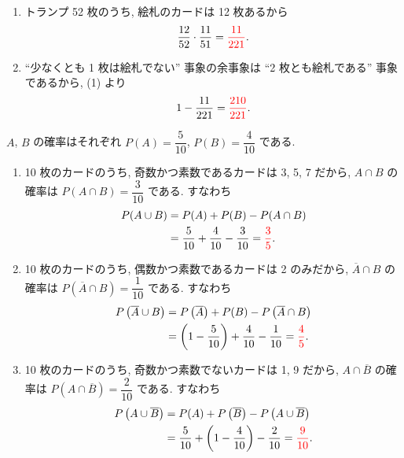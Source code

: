 \begin{enumerate}
	\item{
		トランプ 52 枚のうち, 絵札のカードは 12 枚あるから
		\begin{align}
			\frac{12}{52}\cdot\frac{11}{51} = \textcolor{red}{\frac{11}{221}}.
		\end{align}
	}
	\item{
		``少なくとも 1 枚は絵札でない'' 事象の余事象は ``2 枚とも絵札である'' 事象であるから, (1) より
		\begin{align}
			1 - \frac{11}{221} = \textcolor{red}{\frac{210}{221}}.
		\end{align}
	}
\end{enumerate}

$A$, $B$ の確率はそれぞれ $P(A) = \dfrac{5}{10}$, $P(B) = \dfrac{4}{10}$ である.
\begin{enumerate}
	\item{
		10 枚のカードのうち, 奇数かつ素数であるカードは 3, 5, 7 だから, $A\cap B$ の確率は $P(A\cap B) = \dfrac{3}{10}$ である.
		すなわち
		\begin{align}
			P(A\cup B) &= P(A) + P(B) - P(A\cap B) \\
				&= \frac{5}{10} + \frac{4}{10} - \frac{3}{10} = \textcolor{red}{\frac{3}{5}}.
		\end{align}
	}
	\item{
		10 枚のカードのうち, 偶数かつ素数であるカードは 2 のみだから, $\overline{A}\cap B$ の確率は $P\left(\overline{A}\cap B\right) = \dfrac{1}{10}$ である.
		すなわち
		\begin{align}
			P\left(\overline{A}\cup B\right) &= P\left(\overline{A}\right) + P(B) - P\left(\overline{A}\cap B\right) \\
				&= \left(1 - \frac{5}{10}\right) + \frac{4}{10} - \frac{1}{10} = \textcolor{red}{\frac{4}{5}}.
		\end{align}
	}
	\item{
		10 枚のカードのうち, 奇数かつ素数でないカードは 1, 9 だから, $A\cap \overline{B}$ の確率は $P\left(A\cap\overline{B}\right) = \dfrac{2}{10}$ である.
		すなわち
		\begin{align}
			P\left(A\cup\overline{B}\right) &= P(A) + P\left(\overline{B}\right) - P\left(A\cup\overline{B}\right) \\
				&= \frac{5}{10} + \left(1 - \frac{4}{10}\right) - \frac{2}{10} = \textcolor{red}{\frac{9}{10}}.
		\end{align}
	}
\end{enumerate}

